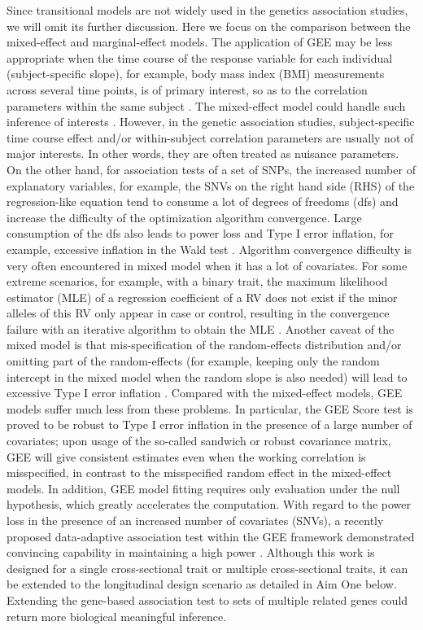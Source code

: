 \documentclass[12pt]{article}
\begin{document}
Since transitional models are not widely used in the genetics association studies, we will omit its further discussion. Here we focus on the comparison between the mixed-effect and marginal-effect models. The application of GEE may be less appropriate when the time course of the response variable for each individual (subject-specific slope), for example, body mass index (BMI) measurements across several time points, is of primary interest, so as to the correlation parameters within the same subject \cite{zeger1988models,liang1986longitudinal}. The mixed-effect model could handle such inference of interests \cite{laird1982random}. However, in the genetic association studies, subject-specific time course effect and/or within-subject correlation parameters are usually not of major interests. In other words, they are often treated as nuisance parameters. On the other hand, for association tests of a set of SNPs, the increased number of explanatory variables, for example, the SNVs on the right hand side (RHS) of the regression-like equation tend to consume a lot of degrees of freedoms (dfs) and increase the difficulty of the optimization algorithm convergence. Large consumption of the dfs also leads to power loss and Type I error inflation, for example, excessive inflation in the Wald test \cite{guo2005small,pan2001robust,shete2004effect}. Algorithm convergence difficulty is very often encountered in mixed model when it has a lot of covariates. For some extreme scenarios, for example, with a binary trait, the maximum likelihood estimator (MLE) of a regression coefficient of a RV does not exist if the minor alleles of this RV only appear in case or control, resulting in the convergence failure with an iterative algorithm to obtain the MLE \cite{zhang2014testing,pan2014powerful}. Another caveat of the mixed model is that mis-specification of the random-effects distribution and/or omitting part of the random-effects (for example, keeping only the random intercept in the mixed model when the random slope is also needed) will lead to excessive Type I error inflation \cite{litiere2007type,Xu2014}. Compared with the mixed-effect models, GEE models suffer much less from these problems. In particular, the GEE Score test is proved to be robust to Type I error inflation in the presence of a large number of covariates; upon usage of the so-called sandwich or robust covariance matrix, GEE will give consistent estimates even when the working correlation is misspecified, in contrast to the misspecified random effect in the mixed-effect models. In addition, GEE model fitting requires only evaluation under the null hypothesis, which greatly accelerates the computation. With regard to the power loss in the presence of an increased number of covariates (SNVs), a recently proposed data-adaptive association test within the GEE framework demonstrated convincing capability in maintaining a high power \cite{zhang2014testing,pan2014powerful}. Although this work is designed for a single cross-sectional trait or multiple cross-sectional traits, it can be extended to the longitudinal design scenario as detailed in Aim One below. 
Extending the gene-based association test to sets of multiple related genes could return more biological meaningful inference.
\end{document}
